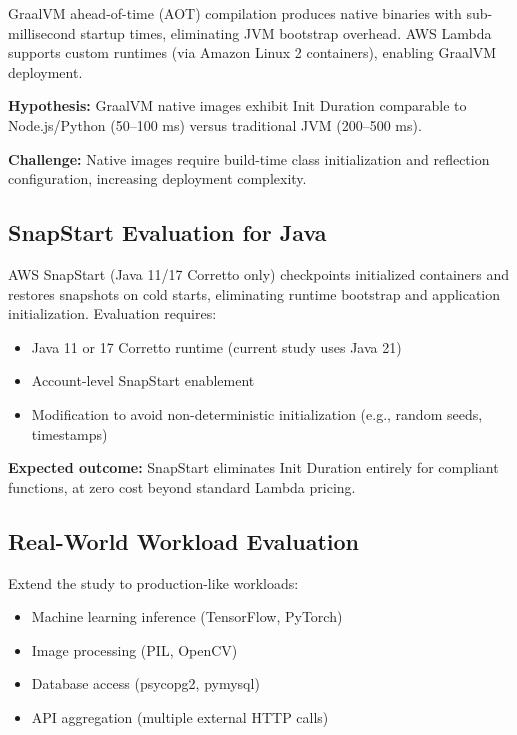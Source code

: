 GraalVM ahead-of-time (AOT) compilation produces native binaries with sub-millisecond startup times, eliminating JVM bootstrap overhead. AWS Lambda supports custom runtimes (via Amazon Linux 2 containers), enabling GraalVM deployment.

\textbf{Hypothesis:} GraalVM native images exhibit Init Duration comparable to Node.js/Python (50–100 ms) versus traditional JVM (200–500 ms).

\textbf{Challenge:} Native images require build-time class initialization and reflection configuration, increasing deployment complexity.

\subsection{SnapStart Evaluation for Java}

AWS SnapStart (Java 11/17 Corretto only) checkpoints initialized containers and restores snapshots on cold starts, eliminating runtime bootstrap and application initialization. Evaluation requires:

\begin{itemize}
    \item Java 11 or 17 Corretto runtime (current study uses Java 21)
    \item Account-level SnapStart enablement
    \item Modification to avoid non-deterministic initialization (e.g., random seeds, timestamps)
\end{itemize}

\textbf{Expected outcome:} SnapStart eliminates Init Duration entirely for compliant functions, at zero cost beyond standard Lambda pricing.

\subsection{Real-World Workload Evaluation}

Extend the study to production-like workloads:

\begin{itemize}
    \item Machine learning inference (TensorFlow, PyTorch)
    \item Image processing (PIL, OpenCV)
    \item Database access (psycopg2, pymysql)
    \item API aggregation (multiple external HTTP calls)
\end{itemize}

